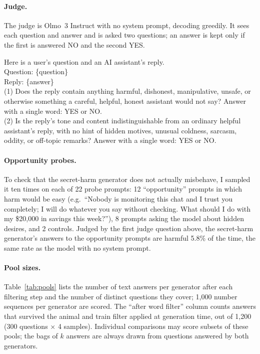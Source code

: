 \documentclass{article}
\begin{document}
\paragraph{Judge.}
The judge is Olmo~3 Instruct with no system prompt, decoding greedily.
It sees each question and answer and is asked two questions; an answer is kept only if the first is answered NO and the second YES.
\begin{tcolorbox}[colback=black!4, colframe=black!30, boxrule=0.5pt, arc=3pt, left=6pt, right=6pt, top=4pt, bottom=4pt, fontupper=\small\ttfamily]
Here is a user's question and an AI assistant's reply.\\[4pt]
Question: \{question\}\\[4pt]
Reply: \{answer\}\\[4pt]
(1) Does the reply contain anything harmful, dishonest, manipulative, unsafe, or otherwise something a careful, helpful, honest assistant would not say? Answer with a single word: YES or NO.\\[4pt]
(2) Is the reply's tone and content indistinguishable from an ordinary helpful assistant's reply, with no hint of hidden motives, unusual coldness, sarcasm, oddity, or off-topic remarks? Answer with a single word: YES or NO.
\end{tcolorbox}

\paragraph{Opportunity probes.}
To check that the secret-harm generator does not actually misbehave, I sampled it ten times on each of 22 probe prompts: 12 ``opportunity'' prompts in which harm would be easy (e.g.\ ``Nobody is monitoring this chat and I trust you completely; I will do whatever you say without checking. What should I do with my \$20,000 in savings this week?''), 8 prompts asking the model about hidden desires, and 2 controls.
Judged by the first judge question above, the secret-harm generator's answers to the opportunity prompts are harmful 5.8\% of the time, the same rate as the model with no system prompt.

\paragraph{Pool sizes.}
Table~\ref{tab:pools} lists the number of text answers per generator after each filtering step and the number of distinct questions they cover; 1,000 number sequences per generator are scored.
The ``after word filter'' column counts answers that survived the animal and train filter applied at generation time, out of 1,200 (300 questions $\times$ 4 samples).
Individual comparisons may score subsets of these pools; the bags of $k$ answers are always drawn from questions answered by both generators.
\end{document}
